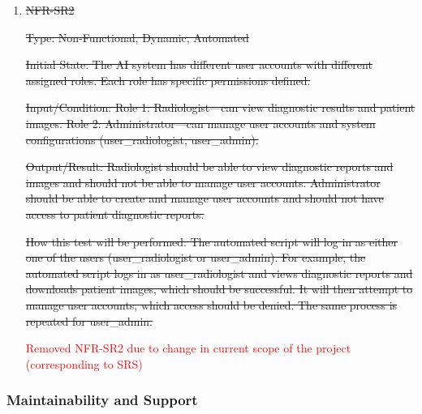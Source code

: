 \documentclass[12pt, titlepage]{article}
\begin{document}
\begin{enumerate}
\begin{enumerate}
Output/Result: All patient data, including images and reports, is encrypted using AES-256 both during storage and transmission.

How this test will be performed: The automated system will trigger the AI system to retrieve a chest X-ray image and process it. It will check if transmitted data (images and reports) appears as encrypted bytes and no readable patient information or image data should be visible. After processing, the AI system stores the data and the automated script will try to open a stored DICOM image or report directly without using the decryption mechanism, which should appear as unreadable, encrypted content (random bytes). When the AI system decrypts and accesses the stored image or report, the automated script will detect if the decrypted data matches the original data.

\item{\sout{NFR-SR2}}\label{NFR-SR2}

\sout{Type: Non-Functional, Dynamic, Automated}

\sout{Initial State: The AI system has different user accounts with different assigned roles. Each role has specific permissions defined.}

\sout{Input/Condition: Role 1: Radiologist—can view diagnostic results and patient images. Role 2: Administrator—can manage user accounts and system configurations (user\_radiologist, user\_admin).}

\sout{Output/Result: Radiologist should be able to view diagnostic reports and images and should not be able to manage user accounts. Administrator should be able to create and manage user accounts and should not have access to patient diagnostic reports.}

\sout{How this test will be performed: The automated script will log in as either one of the users (user\_radiologist or user\_admin). For example, the automated script logs in as user\_radiologist and views diagnostic reports and downloads patient images, which should be successful. It will then attempt to manage user accounts, which access should be denied. The same process is repeated for user\_admin.}

\textcolor{red}{Removed NFR-SR2 due to change in current scope of the project (corresponding to SRS)}

\end{enumerate}

\subsubsection{Maintainability and Support}


\end{enumerate}
\end{document}
